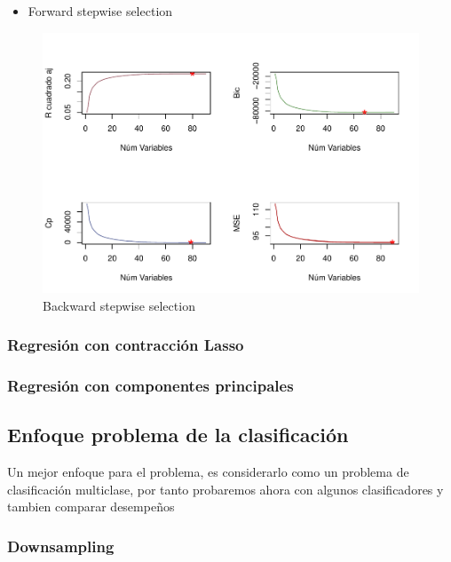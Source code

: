 \documentclass[conference,final,]{IEEEtran}
\providecommand{\tightlist}{%
  \setlength{\itemsep}{0pt}\setlength{\parskip}{0pt}}
\begin{document}
\begin{itemize}
\tightlist
\item
  Forward stepwise selection
\end{itemize}

\begin{figure}[ht]

{\centering \includegraphics[width=0.6\linewidth]{YearPrediction_Reporte_files/figure-latex/unnamed-chunk-6-1} 

}

\caption{Backward stepwise selection}\label{fig:unnamed-chunk-6}
\end{figure}

\hypertarget{regresion-con-contraccion-lasso}{%
\subsubsection{Regresión con contracción
Lasso}\label{regresion-con-contraccion-lasso}}

\hypertarget{regresion-con-componentes-principales}{%
\subsubsection{Regresión con componentes
principales}\label{regresion-con-componentes-principales}}

\hypertarget{enfoque-problema-de-la-clasificacion}{%
\subsection{Enfoque problema de la
clasificación}\label{enfoque-problema-de-la-clasificacion}}

Un mejor enfoque para el problema, es considerarlo como un problema de
clasificación multiclase, por tanto probaremos ahora con algunos
clasificadores y tambien comparar desempeños

\hypertarget{downsampling}{%
\subsubsection{Downsampling}\label{downsampling}}
\end{document}
